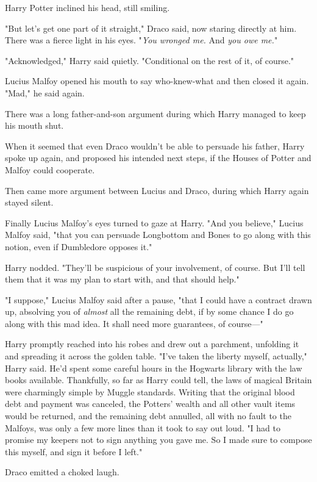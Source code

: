 Harry Potter inclined his head, still smiling.

"But let's get one part of it straight," Draco said, now staring directly at
him. There was a fierce light in his eyes. "\emph{You wronged me.} And
\emph{you owe me.}"

"Acknowledged," Harry said quietly. "Conditional on the rest of it, of course."

Lucius Malfoy opened his mouth to say who-knew-what and then closed it again.
"Mad," he said again.

There was a long father-and-son argument during which Harry managed to keep his
mouth shut.

When it seemed that even Draco wouldn't be able to persuade his father, Harry
spoke up again, and proposed his intended next steps, if the Houses of Potter
and Malfoy could cooperate.

Then came more argument between Lucius and Draco, during which Harry again
stayed silent.

Finally Lucius Malfoy's eyes turned to gaze at Harry. "And you believe," Lucius
Malfoy said, "that you can persuade Longbottom and Bones to go along with this
notion, even if Dumbledore opposes it."

Harry nodded. "They'll be suspicious of your involvement, of course. But I'll
tell them that it was my plan to start with, and that should help."

"I suppose," Lucius Malfoy said after a pause, "that I could have a contract
drawn up, absolving you of \emph{almost} all the remaining debt, if by some
chance I do go along with this mad idea. It shall need more guarantees, of
course---"

Harry promptly reached into his robes and drew out a parchment, unfolding it
and spreading it across the golden table. "I've taken the liberty myself,
actually," Harry said. He'd spent some careful hours in the Hogwarts library
with the law books available. Thankfully, so far as Harry could tell, the laws
of magical Britain were charmingly simple by Muggle standards. Writing that the
original blood debt and payment was canceled, the Potters' wealth and all
other vault items would be returned, and the remaining debt annulled, all with
no fault to the Malfoys, was only a few more lines than it took to say out
loud. "I had to promise my keepers not to sign anything you gave me. So I made
sure to compose this myself, and sign it before I left."

Draco emitted a choked laugh.

